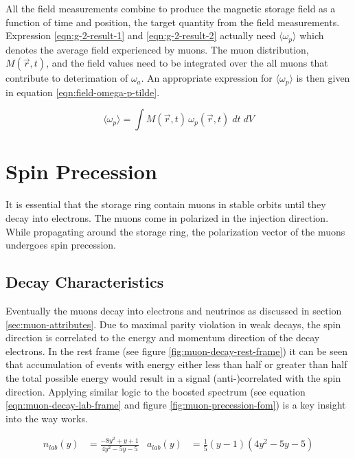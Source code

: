 All the field measurements combine to produce the magnetic storage field as a function of time and position, the target quantity from the field measurements.  Expression \ref{eqn:g-2-result-1} and \ref{eqn:g-2-result-2} actually need $\langle \omega_p \rangle$ which denotes the average field experienced by muons.  The muon distribution, $M(\vec{r}, t)$, and the field values need to be integrated over the all muons that contribute to deterimation of $\omega_a$.  An appropriate expression for $\langle \omega_p \rangle$ is then given in equation \ref{eqn:field-omega-p-tilde}.

\begin{equation}
\label{eqn:field-omega-p-tilde}
\langle \omega_p \rangle = \int M(\vec{r}, t) \, \omega_p(\vec{r}, t)\; dt\;dV
\end{equation}

\section{Spin Precession} \label{sec:spin-precession}

It is essential that the storage ring contain muons in stable orbits until they decay into electrons.  The muons come in polarized in the injection direction.  While propagating around the storage ring, the polarization vector of the muons undergoes spin precession.

\subsection{Decay Characteristics}

Eventually the muons decay into electrons and neutrinos as discussed in section \ref{sec:muon-attributes}. Due to maximal parity violation in weak decays, the spin direction is correlated to the energy and momentum direction of the decay electrons.  In the rest frame (see figure \ref{fig:muon-decay-rest-frame}) it can be seen that accumulation of events with energy either less than half or greater than half the total possible energy would result in a signal (anti-)correlated with the spin direction.  Applying similar logic to the boosted spectrum (see equation \ref{eqn:muon-decay-lab-frame} and figure \ref{fig:muon-precession-fom}) is a key insight into the way \gmtwo works.

\begin{align}
\label{eqn:muon-decay-lab-frame}
n_{lab}(y) & = \frac{-8 y^2 + y + 1}{4 y^2 - 5y - 5} & a_{lab}(y) & = \tfrac{1}{5}(y - 1) (4 y^2 - 5y - 5)
\end{align}


